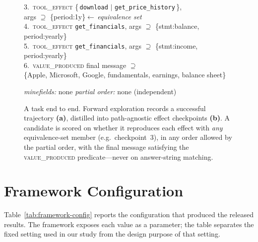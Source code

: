 \begin{figure}[t]
{\begin{minipage}[t]{0.48\textwidth}
{3.~\textsc{tool\_effect} \{\,\texttt{download} $|$ \texttt{get\_price\_history}\,\},\\
\hspace*{1.4em}args $\supseteq$ \{period:1y\}\hfill$\leftarrow$\,\emph{equivalence set}\\[2pt]
4.~\textsc{tool\_effect} \texttt{get\_financials}, args $\supseteq$ \{stmt:balance, period:yearly\}\\[2pt]
5.~\textsc{tool\_effect} \texttt{get\_financials}, args $\supseteq$ \{stmt:income, period:yearly\}\\[2pt]
6.~\textsc{value\_produced} final message $\supseteq$\\
\hspace*{1.4em}\{Apple, Microsoft, Google, fundamentals, earnings, balance sheet\}\par}
\smallskip
\emph{minefields:} none \quad\textbar\quad \emph{partial order:} none (independent)
\end{minipage}}
\caption{A task end to end. Forward exploration records a successful trajectory
\textbf{(a)}, distilled into path-agnostic effect checkpoints \textbf{(b)}. A
candidate is scored on whether it reproduces each effect with \emph{any}
equivalence-set member (e.g.\ checkpoint~3), in any order allowed by the partial
order, with the final message satisfying the \textsc{value\_produced}
predicate---never on answer-string matching.}
\label{fig:example}
\end{figure}

\section{Framework Configuration}
\label{app:config}

Table~\ref{tab:framework-config} reports the configuration that produced the
released results. The framework exposes each value as a parameter; the table
separates the fixed setting used in our study from the design purpose of that
setting.

